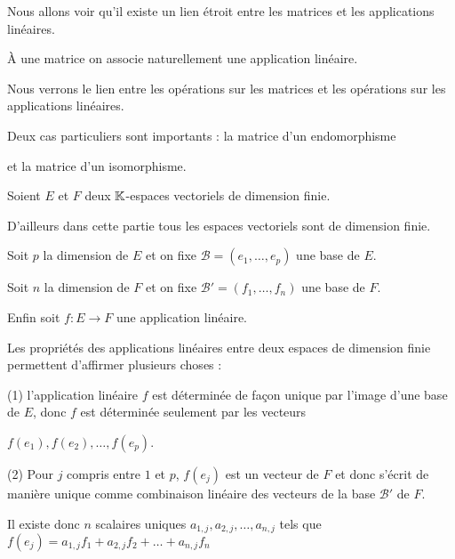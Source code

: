 







\debuttexte


\diapo

\change
Nous allons voir qu'il existe un lien étroit entre 
les matrices et les applications linéaires.

\change
\`A une matrice on associe naturellement une application linéaire. 


\change
Nous verrons le lien entre les opérations sur les matrices et les opérations
sur les applications linéaires.

\change
Deux cas particuliers sont importants :
la matrice d'un endomorphisme

\change
et la matrice d'un isomorphisme.


\diapo

Soient $E$ et $F$ deux $\mathbb{K}$-espaces vectoriels de dimension finie.

D'ailleurs dans cette partie tous les espaces vectoriels sont de dimension finie.

\change
Soit $p$ la dimension de $E$ et on fixe $\mathcal{B}=(e_1, \dots ,e_p)$
une base de $E$.

\change
Soit $n$ la dimension de $F$ et on fixe 
$\mathcal{B}'=(f_1, \dots ,f_n)$ une base de $F$.

\change
Enfin soit $f : E \to F$ une application linéaire.


\change
Les propriétés des applications linéaires entre deux espaces
de dimension finie permettent d'affirmer plusieurs choses :


(1) l'application linéaire $f$ est déterminée de façon unique par l'image
d'une base de $E$, donc $f$ est déterminée seulement par les vecteurs 

$f(e_1), f(e_2), \ldots, f(e_p)$.

\change
(2) Pour $j$ compris entre $1$ et $p$, 
$f(e_j)$ est un vecteur de $F$ et donc s'écrit de manière unique comme combinaison
linéaire des vecteurs de la base $\mathcal{B}'$ de $F$.

\change
Il existe donc $n$ scalaires uniques $a_{1,j},a_{2,j}, \ldots , a_{n,j}$
tels que 
$f (e_j)=a_{1,j}f_1+a_{2,j}f_2+\dots +a_{n,j}f_n$

